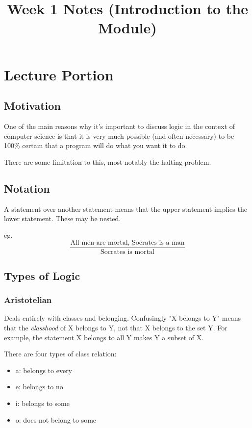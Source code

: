 \documentclass{article}
\title{Week 1 Notes (Introduction to the Module)}
\begin{document}
\maketitle

\section{Lecture Portion}

\subsection{Motivation}

One of the main reasons why it's important to discuss logic in the
context of computer science is that it is very much possible (and
often necessary) to be 100\% certain that a program will do what
you want it to do.

There are some limitation to this, most notably the halting problem.

\subsection{Notation}

A statement over another statement means that the upper statement
implies the lower statement. These may be nested. 

eg.
\[
\frac{\text{All men are mortal, Socrates is a man}}
     {\text{Socrates is mortal}}
\]

\subsection{Types of Logic}

\subsubsection{Aristotelian}

Deals entirely with classes and belonging. Confusingly "X belongs
to Y" means that the \textit{classhood} of X belongs to Y, not that
X belongs to the set Y. For example, the statement X belongs to all
Y makes Y a subset of X.

There are four types of class relation:

\begin{itemize}
	\item a: belongs to every
	\item e: belongs to no
	\item i: belongs to some
	\item o: does not belong to some
\end{itemize}
\end{document}

